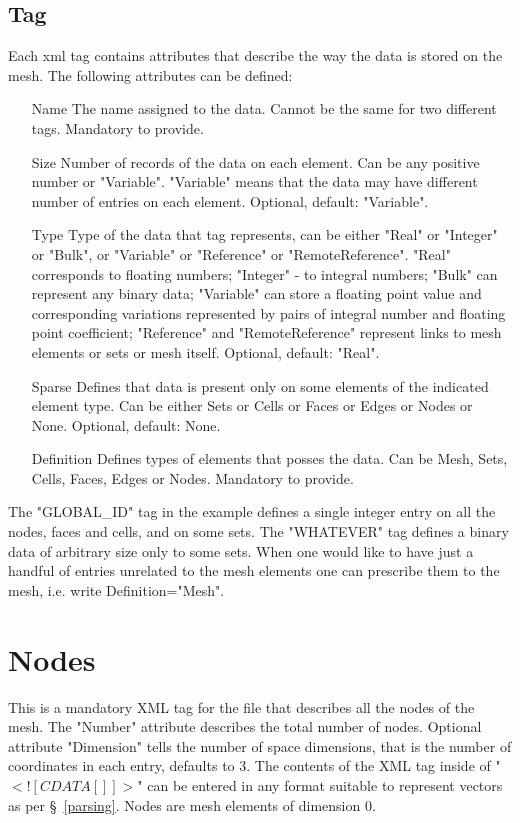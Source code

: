 \documentclass[14pt]{article}
\begin{document}
\subsection{Tag}
Each xml tag contains attributes that describe the way the data is stored on the mesh. The following attributes can be defined:
\begin{itemize}
\item[Name] The name assigned to the data. Cannot be the same for two different tags. Mandatory to provide.
\item[Size] Number of records of the data on each element. Can be any positive number or "Variable". "Variable" means that the data may have different number of entries on each element. Optional, default: "Variable".
\item[Type] Type of the data that tag represents, can be either "Real" or "Integer" or "Bulk", or "Variable" or "Reference" or "RemoteReference". "Real" corresponds to floating numbers; "Integer" - to integral numbers; "Bulk" can represent any binary data; "Variable" can store a floating point value and corresponding variations represented by pairs of integral number and floating point coefficient; "Reference" and "RemoteReference" represent links to mesh elements or sets or mesh itself. Optional, default: "Real".
\item[Sparse] Defines that data is present only on some elements of the indicated element type. Can be either Sets or Cells or Faces or Edges or Nodes or None. Optional, default: None.
\item[Definition] Defines types of elements that posses the data. Can be Mesh, Sets, Cells, Faces, Edges or Nodes. Mandatory to provide.
\end{itemize}
The "GLOBAL\_ID" tag in the example defines a single integer entry on all the nodes, faces and cells, and on some sets. The "WHATEVER" tag defines a binary data of arbitrary size only to some sets. When one would like to have just a handful of entries unrelated to the mesh elements one can prescribe them to the mesh, i.e. write Definition="Mesh".

\section{Nodes}
This is a mandatory XML tag for the file that describes all the nodes of the mesh. The "Number" attribute describes the total number of nodes. Optional attribute "Dimension" tells the number of space dimensions, that is the number of coordinates in each entry, defaults to 3. The contents of the XML tag inside of "$<![CDATA[]]>$" can be entered in any format suitable to represent vectors as per \S~\ref{parsing}. Nodes are mesh elements of dimension 0.
\end{document}
